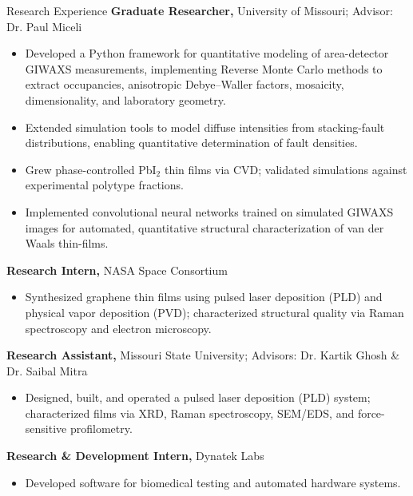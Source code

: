 \begin{rubric}{Research Experience}
    \entry*[2021 -- Present]%
    \textbf{Graduate Researcher,} University of Missouri; Advisor: Dr. Paul Miceli
    \begin{itemize}
        \item Developed a Python framework for quantitative modeling of area-detector GIWAXS measurements, implementing Reverse Monte Carlo methods to extract occupancies, anisotropic Debye--Waller factors, mosaicity, dimensionality, and laboratory geometry.
        \item Extended simulation tools to model diffuse intensities from stacking-fault distributions, enabling quantitative determination of fault densities.
        \item Grew phase-controlled PbI$_2$ thin films via CVD; validated simulations against experimental polytype fractions.
        \item Implemented convolutional neural networks trained on simulated GIWAXS images for automated, quantitative structural characterization of van der Waals thin-films.
    \end{itemize}

    \entry*[2019 -- 2020]%
        \textbf{Research Intern,} NASA Space Consortium
        \begin{itemize}
            \item Synthesized graphene thin films using pulsed laser deposition (PLD) and physical vapor deposition (PVD); characterized structural quality via Raman spectroscopy and electron microscopy.
        \end{itemize}
        
    \entry*[2017 -- 2020]%
        \textbf{Research Assistant,} Missouri State University; Advisors: Dr. Kartik Ghosh \& Dr. Saibal Mitra
        \begin{itemize}
        \item Designed, built, and operated a pulsed laser deposition (PLD) system; characterized films via XRD, Raman spectroscopy, SEM/EDS, and force-sensitive profilometry.
        \end{itemize}

    
    \entry*[2019]%
        \textbf{Research \& Development Intern,} Dynatek Labs
        \begin{itemize}
            \item Developed software for biomedical testing and automated hardware systems.
        \end{itemize}
\end{rubric}
